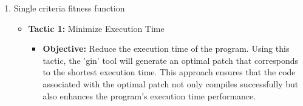 \begin{enumerate}
    \item Single criteria fitness function
    \begin{itemize}
        \item \textbf{Tactic 1:} Minimize Execution Time
            \begin{itemize}
             \item \textbf{Objective:} Reduce the execution time of the program. Using this tactic, the 'gin' tool will generate an optimal patch that corresponds to the shortest execution time. This approach ensures that the code associated with the optimal patch not only compiles successfully but also enhances the program's execution time performance.
             \end{itemize}


\end{itemize}
\end{enumerate}
